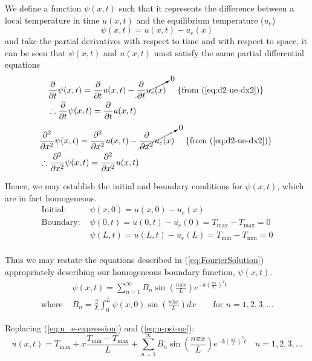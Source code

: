 We define a function $\psi(x,t)$ such that it represents the difference between a local temperature in time $u(x,t)$ and the equilibrium temperature ($u_e$)
\begin{equation} \label{eq:u-psi-ue}
    \psi(x,t) = u(x,t) - u_e(x)
\end{equation}
and take the partial derivatives with respect to time and with respect to space, it can be seen that $\psi(x,t)$ and $u(x,t)$ must satisfy the same partial differential equations
\begin{equation*}
\begin{split}
    &\frac{ \partial}{ \partial t }\psi(x,t) = \frac{ \partial }{ \partial t }u(x,t) - \cancelto{0}{ \frac{ \partial }{ \partial t }u_e(x) } \quad \text{ \{from (\ref{eq:d2-ue-dx2})\} }\\
    & \therefore \frac{ \partial}{ \partial t }\psi(x,t) = \frac{ \partial }{ \partial t } u(x,t)
\end{split}
\end{equation*}
\begin{equation*}
\begin{split}
    &\frac{ \partial ^2 }{\partial x^2} \psi(x,t) = \frac{ \partial^2 }{\partial x^2} u(x,t) - \cancelto{0}{\frac{ \partial }{\partial x^2}u_e(x)} \quad \text{ \{from (\ref{eq:d2-ue-dx2})\} }\\
    &\therefore \frac{ \partial ^2 }{\partial x^2} \psi(x,t) = \frac{ \partial^2 }{\partial x^2} u(x,t)
\end{split}
\end{equation*}

Hence, we may establish the initial and boundary conditions for $\psi(x,t)$, which are in fact homogeneous.
\begin{equation*}
\begin{split}
    \text{Initial: }& \psi(x,0) = u(x,0) - u_e(x) \\
    \text{Boundary: }& \psi(0,t) = u(0,t) - u_e(0) = T_{\max} - T_{\max} = 0 \\
                     & \psi(L,t)= u(L,t) - u_e(L) = T_{\min} - T_{\min} = 0 \\
\end{split}
\end{equation*}

Thus we may restate the equations described in (\ref{eq:FourierSolution}) appropriately describing our homogeneous boundary function, $\psi(x,t)$.
\begin{equation}
\begin{split} \label{eq:psi-general-solution}
	&\psi(x,t) = \sum_{n=1}^{\infty} B_n \sin \left (\frac{n\pi x}{L} \right) e^{-k(\frac{n\pi}{L})^2 t} \\
	\text{where }&B_n = \frac{2}{L} \int_0^L \psi(x,0) \sin \left( \frac{n\pi x}{L} \right) dx \quad \quad \text{for } n=1,2,3,\ldots 
\end{split}
\end{equation}

Replacing (\ref{eq:u_e-expression}) and (\ref{eq:u-psi-ue}):
\begin{equation}\label{eq:u-solution}
u(x,t) = T_{\max} + x\frac{ T_{\min}-T_{\max} }{ L } +  \sum_{n=1}^{\infty} B_n \sin \left (\frac{n\pi x}{L} \right) e^{-k \left( \frac{n\pi}{L} \right)^2 t} \quad n=1,2,3,\ldots
\end{equation}